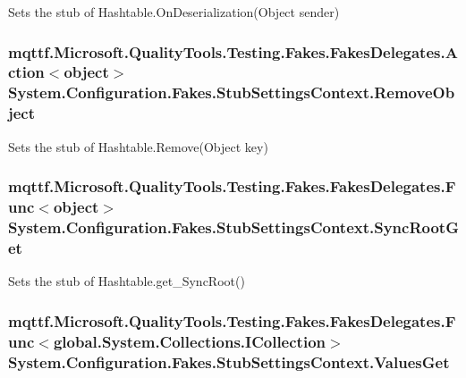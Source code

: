 Sets the stub of Hashtable.\-On\-Deserialization(\-Object sender)

\hypertarget{class_system_1_1_configuration_1_1_fakes_1_1_stub_settings_context_ae40aaf979e3cf8a901292b9fc264ec45}{
\subsubsection[{Remove\-Object}]{\setlength{\rightskip}{0pt plus 5cm}mqttf.\-Microsoft.\-Quality\-Tools.\-Testing.\-Fakes.\-Fakes\-Delegates.\-Action$<$object$>$ System.\-Configuration.\-Fakes.\-Stub\-Settings\-Context.\-Remove\-Object}}\label{class_system_1_1_configuration_1_1_fakes_1_1_stub_settings_context_ae40aaf979e3cf8a901292b9fc264ec45}


Sets the stub of Hashtable.\-Remove(\-Object key)

\hypertarget{class_system_1_1_configuration_1_1_fakes_1_1_stub_settings_context_a0a2eea09b6468848b46210790962b274}{
\subsubsection[{Sync\-Root\-Get}]{\setlength{\rightskip}{0pt plus 5cm}mqttf.\-Microsoft.\-Quality\-Tools.\-Testing.\-Fakes.\-Fakes\-Delegates.\-Func$<$object$>$ System.\-Configuration.\-Fakes.\-Stub\-Settings\-Context.\-Sync\-Root\-Get}}\label{class_system_1_1_configuration_1_1_fakes_1_1_stub_settings_context_a0a2eea09b6468848b46210790962b274}


Sets the stub of Hashtable.\-get\-\_\-\-Sync\-Root()

\hypertarget{class_system_1_1_configuration_1_1_fakes_1_1_stub_settings_context_ae9aa542f7b5c0ee5cd1a540b312da130}{
\subsubsection[{Values\-Get}]{\setlength{\rightskip}{0pt plus 5cm}mqttf.\-Microsoft.\-Quality\-Tools.\-Testing.\-Fakes.\-Fakes\-Delegates.\-Func$<$global.\-System.\-Collections.\-I\-Collection$>$ System.\-Configuration.\-Fakes.\-Stub\-Settings\-Context.\-Values\-Get}}\label{class_system_1_1_configuration_1_1_fakes_1_1_stub_settings_context_ae9aa542f7b5c0ee5cd1a540b312da130}


